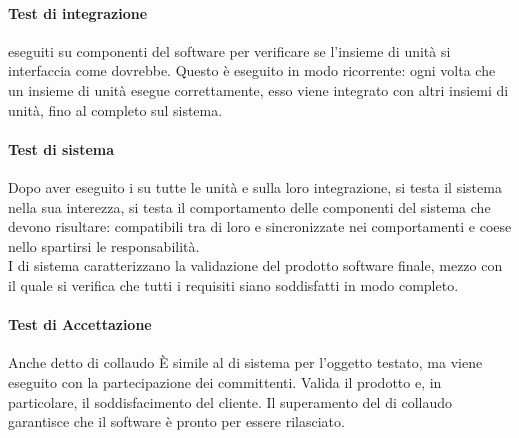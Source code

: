                 \paragraph{Test di integrazione}
                     eseguiti su componenti del software per verificare se l'insieme di unità si interfaccia come dovrebbe. Questo  è eseguito in modo ricorrente: ogni volta che un insieme di unità esegue correttamente, esso viene integrato con altri insiemi di unità, fino al  completo sul sistema.\\
                \paragraph{Test di sistema}
                    Dopo aver eseguito i  su tutte le unità e sulla loro integrazione, si testa il sistema nella sua interezza, si testa il comportamento delle componenti del sistema che devono risultare: compatibili tra di loro e sincronizzate nei comportamenti e coese nello spartirsi le responsabilità.\\
                    I  di sistema caratterizzano la validazione del prodotto software finale, mezzo con il quale si verifica che tutti i requisiti siano soddisfatti in modo completo.\\
                \paragraph{Test di Accettazione}
                    Anche detto  di collaudo È simile al  di sistema per l’oggetto testato, ma viene eseguito con la partecipazione dei committenti. Valida il prodotto e, in particolare, il soddisfacimento del cliente. Il superamento del  di collaudo garantisce che il software è pronto per essere rilasciato.
